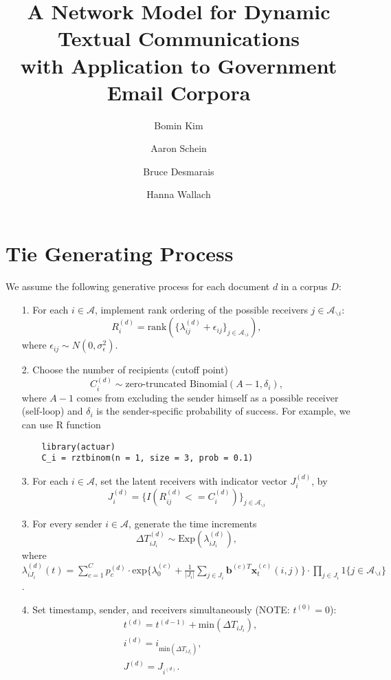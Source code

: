 \documentclass[a4paper]{article}
\title{A Network Model for Dynamic Textual Communications \\with Application to
	Government Email Corpora}
\author[1]{Bomin Kim}
\author[3]{Aaron Schein}
\author[1]{Bruce Desmarais}
\author[2,3]{Hanna Wallach}
\affil[1]{Pennsylvania State University}
\affil[2]{Microsoft Research NYC}
\affil[3]{University of Massachusetts Amherst}
\begin{document}
\maketitle
\section{Tie Generating Process}\label{subsec: Tie Generating Process1}
We assume the following generative process for each document $d$ in a corpus $D$:
\begin{itemize}
	\item[1.] For each $i \in \mathcal{A}$, implement rank ordering of the possible receivers $j \in \mathcal{A}_{\backslash i}$:
	\begin{equation}
	R^{(d)}_i = \mbox{rank}(\{\lambda_{ij}^{(d)} + \epsilon_{ij}\}_{j\in \mathcal{A}_{\backslash i} }),
	\end{equation}
	where $\epsilon_{ij} \sim N(0, \sigma_\epsilon^2)$.
	\item[2.] Choose the number of recipients (cutoff point)
	\begin{equation}
		C_i^{(d)} \sim \mbox{zero-truncated Binomial}(A-1, \delta_i),
	\end{equation}
	where $A-1$ comes from excluding the sender himself as a possible receiver (self-loop) and $\delta_i$ is the sender-specific probability of success. For example, we can use R function
	\begin{verbatim}
	library(actuar)
	C_i = rztbinom(n = 1, size = 3, prob = 0.1)
	\end{verbatim}
	\item[3.] For each $i \in \mathcal{A}$, set the latent receivers with indicator vector $J^{(d)}_i$, by
	\begin{equation}
	J_i^{(d)} = \{I(R_{ij}^{(d)}<=C_i^{(d)})\}_{j\in \mathcal{A}_{\backslash i} }
	\end{equation} 
	\item[3.] For every sender $i \in \mathcal{A}$, generate the time increments \begin{equation}
		\Delta T^{(d)}_{i{J_i}} \sim \mbox{Exp}(\lambda_{i{J_i}}^{(d)}),
	\end{equation}
	where $\lambda^{(d)}_{iJ_i}(t)= \sum\limits_{c=1}^{C} p^{(d)}_c\cdot\mbox{exp}\Big\{\lambda^{(c)}_0+\frac{1}{|J_i|}\sum\limits_{j \in J_i} \boldsymbol{b}^{(c)T}\boldsymbol{x}^{(c)}_t(i, j)\Big\}\cdot \prod\limits_{j \in J_i}1\{j \in \mathcal{A}_{\backslash i}\}$.
	\item[4.] Set timestamp, sender, and receivers simultaneously (NOTE: $t^{(0)}=0$):
	\begin{equation}
		\begin{aligned}
			&t^{(d)} = t^{(d-1)}+\mbox{min}(\Delta T_{i{J_i}}),\\
			&i^{(d)} = i_{\mbox{min}(\Delta T_{i{J_i}})}, \\
			&J^{(d)} = J_{i^{(d)}}.
		\end{aligned}
	\end{equation}
\end{itemize}
\end{document}
